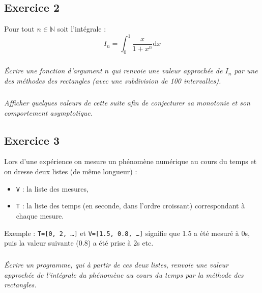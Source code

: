 \documentclass[10pt,oneside]{article}
\begin{document}
% 
 
 
\newpage


\subsection*{Exercice 2}
\setcounter{subparagraph}{0} 
Pour tout $n\in\mathbb{N}$ soit l'intégrale : 
$$I_n=\int_0^1\frac{x}{1+x^n} \text{d}x$$

\subparagraph{}
\textit{Écrire une fonction d'argument $n$ qui renvoie une valeur approchée de $I_n$ par une des méthodes des rectangles (avec une subdivision de 100 intervalles).}

\subparagraph{}
\textit{Afficher quelques  valeurs de cette suite afin de conjecturer sa monotonie et son comportement asymptotique.}

\subsection*{Exercice 3}
\setcounter{subparagraph}{0}
Lors d'une expérience on mesure un phénomène numérique au cours du temps et on dresse deux listes (de même longueur) :
\begin{itemize}
\item \texttt{V} : la liste des mesures, 
\item \texttt{T} : la liste des temps (en seconde, dans l'ordre croissant) correspondant à chaque mesure.
\end{itemize}
Exemple : \texttt{T=[0, 2, \ldots]} et \texttt{V=[1.5, 0.8, \ldots]} signifie que 1.5 a été mesuré à 0s, puis la valeur suivante  (0.8) a été prise à 2s etc.

\subparagraph{}
\textit{Écrire un programme, qui à partir de ces deux listes, renvoie une valeur approchée de l'intégrale du phénomène au cours du temps par la méthode des rectangles.}
\end{document}
